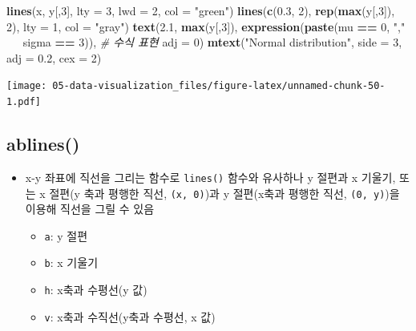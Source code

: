 \documentclass[
  11pt,
]{krantz}
\newenvironment{Shaded}{\begin{snugshade}}{\end{snugshade}}
\newcommand{\CommentTok}[1]{\textcolor[rgb]{0.37,0.37,0.37}{\textit{#1}}}
\newcommand{\DataTypeTok}[1]{\textcolor[rgb]{0.27,0.27,0.27}{#1}}
\newcommand{\DecValTok}[1]{\textcolor[rgb]{0.06,0.06,0.06}{#1}}
\newcommand{\ErrorTok}[1]{\textcolor[rgb]{0.14,0.14,0.14}{\textbf{#1}}}
\newcommand{\FloatTok}[1]{\textcolor[rgb]{0.06,0.06,0.06}{#1}}
\newcommand{\KeywordTok}[1]{\textcolor[rgb]{0.27,0.27,0.27}{\textbf{#1}}}
\newcommand{\NormalTok}[1]{#1}
\newcommand{\OperatorTok}[1]{\textcolor[rgb]{0.43,0.43,0.43}{\textbf{#1}}}
\newcommand{\StringTok}[1]{\textcolor[rgb]{0.5,0.5,0.5}{#1}}
\providecommand{\tightlist}{%
  \setlength{\itemsep}{0pt}\setlength{\parskip}{0pt}}
\begin{document}
\begin{Shaded}
\begin{Highlighting}[]
\KeywordTok{lines}\NormalTok{(x, y[,}\DecValTok{3}\NormalTok{], }\DataTypeTok{lty =} \DecValTok{3}\NormalTok{, }\DataTypeTok{lwd =} \DecValTok{2}\NormalTok{, }\DataTypeTok{col =} \StringTok{"green"}\NormalTok{)}
\KeywordTok{lines}\NormalTok{(}\KeywordTok{c}\NormalTok{(}\FloatTok{0.3}\NormalTok{, }\DecValTok{2}\NormalTok{), }\KeywordTok{rep}\NormalTok{(}\KeywordTok{max}\NormalTok{(y[,}\DecValTok{3}\NormalTok{]), }\DecValTok{2}\NormalTok{), }\DataTypeTok{lty =} \DecValTok{1}\NormalTok{, }\DataTypeTok{col =} \StringTok{"gray"}\NormalTok{)}
\KeywordTok{text}\NormalTok{(}\FloatTok{2.1}\NormalTok{, }\KeywordTok{max}\NormalTok{(y[,}\DecValTok{3}\NormalTok{]),}
     \KeywordTok{expression}\NormalTok{(}\KeywordTok{paste}\NormalTok{(mu }\OperatorTok{==}\StringTok{ }\DecValTok{0}\NormalTok{, }\StringTok{","} \OperatorTok{~}\ErrorTok{~}\StringTok{ }\NormalTok{sigma }\OperatorTok{==}\StringTok{ }\DecValTok{3}\NormalTok{)), }\CommentTok{# 수식 표현}
     \DataTypeTok{adj =} \DecValTok{0}\NormalTok{)}
\KeywordTok{mtext}\NormalTok{(}\StringTok{"Normal distribution"}\NormalTok{, }\DataTypeTok{side =} \DecValTok{3}\NormalTok{, }\DataTypeTok{adj =} \FloatTok{0.2}\NormalTok{, }\DataTypeTok{cex =} \DecValTok{2}\NormalTok{)}
\end{Highlighting}
\end{Shaded}

\texttt{[image: 05-data-visualization\_files/figure-latex/unnamed-chunk-50-1.pdf]}

\normalsize

\hypertarget{ablines}{%
\subsection{ablines()}\label{ablines}}

\begin{itemize}
\tightlist
\item
  x-y 좌표에 직선을 그리는 함수로 \texttt{lines()} 함수와 유사하나 y 절편과 x 기울기, 또는 x 절편(y 축과 평행한 직선, \texttt{(x,\ 0)})과 y 절편(x축과 평행한 직선, \texttt{(0,\ y)})을 이용해 직선을 그릴 수 있음

  \begin{itemize}
  \tightlist
  \item
    \texttt{a}: y 절편
  \item
    \texttt{b}: x 기울기
  \item
    \texttt{h}: x축과 수평선(y 값)
  \item
    \texttt{v}: x축과 수직선(y축과 수평선, x 값)
  \end{itemize}
\end{itemize}
\end{document}

